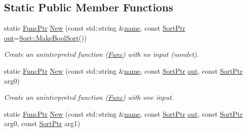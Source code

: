 \subsection*{Static Public Member Functions}
\begin{DoxyCompactItemize}
\item 
\mbox{\label{classilang_1_1_func_ac2ecaf43edc5970d5dee38f6b4ea585e}} 
static \mbox{\hyperlink{classilang_1_1_func_a91aa192ceb8b9025423fdb95c8429282}{Func\+Ptr}} \mbox{\hyperlink{classilang_1_1_func_ac2ecaf43edc5970d5dee38f6b4ea585e}{New}} (const std\+::string \&\mbox{\hyperlink{classilang_1_1_object_acf20b072e69f572910d7d80c93af0b38}{name}}, const \mbox{\hyperlink{namespaceilang_ae01073336878d60a231f4fe96d45ab55}{Sort\+Ptr}} \mbox{\hyperlink{classilang_1_1_func_a58414a3455af0484ccfcce8401b02d37}{out}}=\mbox{\hyperlink{classilang_1_1_sort_ad051b4711582cf543e6ed268dd24907c}{Sort\+::\+Make\+Bool\+Sort}}())
\begin{DoxyCompactList}\small\item\em Create an uninterpreted function (\mbox{\hyperlink{classilang_1_1_func}{Func}}) with no input (nondet). \end{DoxyCompactList}\item 
\mbox{\label{classilang_1_1_func_a03ce0e4ccaf180344f53aa897ea0a1df}} 
static \mbox{\hyperlink{classilang_1_1_func_a91aa192ceb8b9025423fdb95c8429282}{Func\+Ptr}} \mbox{\hyperlink{classilang_1_1_func_a03ce0e4ccaf180344f53aa897ea0a1df}{New}} (const std\+::string \&\mbox{\hyperlink{classilang_1_1_object_acf20b072e69f572910d7d80c93af0b38}{name}}, const \mbox{\hyperlink{namespaceilang_ae01073336878d60a231f4fe96d45ab55}{Sort\+Ptr}} \mbox{\hyperlink{classilang_1_1_func_a58414a3455af0484ccfcce8401b02d37}{out}}, const \mbox{\hyperlink{namespaceilang_ae01073336878d60a231f4fe96d45ab55}{Sort\+Ptr}} arg0)
\begin{DoxyCompactList}\small\item\em Create an uninterpreted function (\mbox{\hyperlink{classilang_1_1_func}{Func}}) with one input. \end{DoxyCompactList}\item 
\mbox{\label{classilang_1_1_func_af1efae507481a0bdee59de1d88ec7b1f}} 
static \mbox{\hyperlink{classilang_1_1_func_a91aa192ceb8b9025423fdb95c8429282}{Func\+Ptr}} \mbox{\hyperlink{classilang_1_1_func_af1efae507481a0bdee59de1d88ec7b1f}{New}} (const std\+::string \&\mbox{\hyperlink{classilang_1_1_object_acf20b072e69f572910d7d80c93af0b38}{name}}, const \mbox{\hyperlink{namespaceilang_ae01073336878d60a231f4fe96d45ab55}{Sort\+Ptr}} \mbox{\hyperlink{classilang_1_1_func_a58414a3455af0484ccfcce8401b02d37}{out}}, const \mbox{\hyperlink{namespaceilang_ae01073336878d60a231f4fe96d45ab55}{Sort\+Ptr}} arg0, const \mbox{\hyperlink{namespaceilang_ae01073336878d60a231f4fe96d45ab55}{Sort\+Ptr}} arg1)

\end{DoxyCompactItemize}
